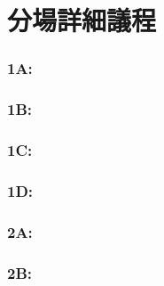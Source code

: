 \documentclass[20pt, a4paper, landscape]{extbook}
\begin{document}
  

\chapter*{分場詳細議程}

\subsection*{1A: \TitleOneA}
\subsubsection*{\ChairOneA}
\ListOneA

\subsection*{1B: \TitleOneB}
\subsubsection*{\ChairOneB}
\ListOneB

\subsection*{1C: \TitleOneC}
\subsubsection*{\ChairOneC}
\ListOneC

\subsection*{1D: \TitleOneD}
\subsubsection*{\ChairOneD}
\ListOneD

\subsection*{2A: \TitleTwoA}
\subsubsection*{\ChairTwoA}
\ListTwoA

\subsection*{2B: \TitleTwoB}
\subsubsection*{\ChairTwoB}
\ListTwoB
\end{document}
